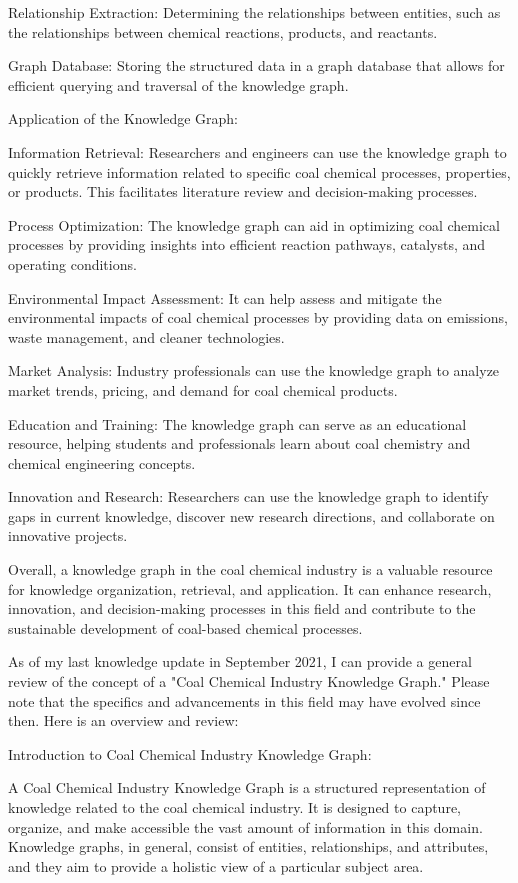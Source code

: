 Relationship Extraction: Determining the relationships between entities, such as the relationships between chemical reactions, products, and reactants.

Graph Database: Storing the structured data in a graph database that allows for efficient querying and traversal of the knowledge graph.

Application of the Knowledge Graph:

Information Retrieval: Researchers and engineers can use the knowledge graph to quickly retrieve information related to specific coal chemical processes, properties, or products. This facilitates literature review and decision-making processes.

Process Optimization: The knowledge graph can aid in optimizing coal chemical processes by providing insights into efficient reaction pathways, catalysts, and operating conditions.

Environmental Impact Assessment: It can help assess and mitigate the environmental impacts of coal chemical processes by providing data on emissions, waste management, and cleaner technologies.

Market Analysis: Industry professionals can use the knowledge graph to analyze market trends, pricing, and demand for coal chemical products.

Education and Training: The knowledge graph can serve as an educational resource, helping students and professionals learn about coal chemistry and chemical engineering concepts.

Innovation and Research: Researchers can use the knowledge graph to identify gaps in current knowledge, discover new research directions, and collaborate on innovative projects.

Overall, a knowledge graph in the coal chemical industry is a valuable resource for knowledge organization, retrieval, and application. It can enhance research, innovation, and decision-making processes in this field and contribute to the sustainable development of coal-based chemical processes.


As of my last knowledge update in September 2021, I can provide a general review of the concept of a "Coal Chemical Industry Knowledge Graph." Please note that the specifics and advancements in this field may have evolved since then. Here is an overview and review:

Introduction to Coal Chemical Industry Knowledge Graph:

A Coal Chemical Industry Knowledge Graph is a structured representation of knowledge related to the coal chemical industry. It is designed to capture, organize, and make accessible the vast amount of information in this domain. Knowledge graphs, in general, consist of entities, relationships, and attributes, and they aim to provide a holistic view of a particular subject area.

